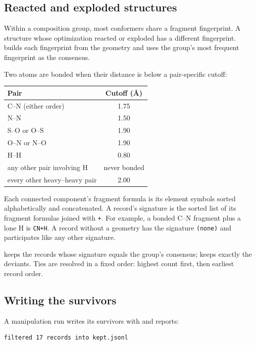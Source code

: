 \subsection{Reacted and exploded structures}\label{sec:reacted}

Within a composition group, most conformers share a fragment fingerprint. A
structure whose optimization reacted or exploded has a different fingerprint.
\CJKQC{} builds each fingerprint from the geometry and uses the group's most
frequent fingerprint as the consensus.

Two atoms are bonded when their distance is below a pair-specific cutoff:

\begin{center}
\begin{tabular}{@{}lc@{}}
\toprule
\textbf{Pair} & \textbf{Cutoff (\AA{})} \\
\midrule
C--N (either order) & 1.75 \\
N--N & 1.50 \\
S--O or O--S & 1.90 \\
O--N or N--O & 1.90 \\
H--H & 0.80 \\
any other pair involving H & never bonded \\
every other heavy--heavy pair & 2.00 \\
\bottomrule
\end{tabular}
\end{center}

Each connected component's fragment formula is its element symbols sorted
alphabetically and concatenated. A record's signature is the sorted list of
its fragment formulas joined with \texttt{+}. For example, a bonded C--N
fragment plus a lone H is \texttt{CN+H}. A record without a geometry has the
signature \texttt{(none)} and participates like any other signature.

 keeps the records whose signature equals the group's
consensus;  keeps exactly the deviants. Ties are resolved in a
fixed order: highest count first, then earliest record order.

\subsection{Writing the survivors}\label{sec:filter-out}

A manipulation run writes its survivors with  and reports:

\begin{verbatim}
filtered 17 records into kept.jsonl
\end{verbatim}

